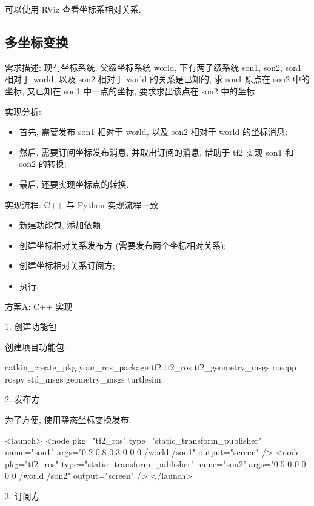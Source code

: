 \documentclass[openany, fontset=windowsold]{ctexbook}
\theoremstyle{kaiti}
\theoremstyle{normal}
\begin{document}
可以使用 RViz 查看坐标系相对关系.

\subsection{多坐标变换}

需求描述: 现有坐标系统, 父级坐标系统 world, 下有两子级系统 son1, son2, son1 相对于 world, 以及 son2 相对于 world 的关系是已知的, 求 son1 原点在 son2 中的坐标, 又已知在 son1 中一点的坐标, 要求求出该点在 son2 中的坐标.

实现分析:

\begin{itemize}
  \item 首先, 需要发布 son1 相对于 world, 以及 son2 相对于 world 的坐标消息;
  \item 然后, 需要订阅坐标发布消息, 并取出订阅的消息, 借助于 tf2 实现 son1 和 son2 的转换;
  \item 最后, 还要实现坐标点的转换.
\end{itemize}

实现流程: C++ 与 Python 实现流程一致

\begin{itemize}
  \item 新建功能包, 添加依赖;
  \item 创建坐标相对关系发布方 (需要发布两个坐标相对关系);
  \item 创建坐标相对关系订阅方;
  \item 执行.
\end{itemize}

方案A: C++ 实现

1. 创建功能包

创建项目功能包:

\begin{bash}
  catkin_create_pkg your_ros_package tf2 tf2_ros tf2_geometry_msgs roscpp rospy std_msgs geometry_msgs turtlesim
\end{bash}

2. 发布方

为了方便, 使用静态坐标变换发布.

\begin{xml}
  <launch>
      <node pkg="tf2_ros" type="static_transform_publisher" name="son1" args="0.2 0.8 0.3 0 0 0 /world /son1" output="screen" />
      <node pkg="tf2_ros" type="static_transform_publisher" name="son2" args="0.5 0 0 0 0 0 /world /son2" output="screen" />
  </launch>
\end{xml}

3. 订阅方
\end{document}
